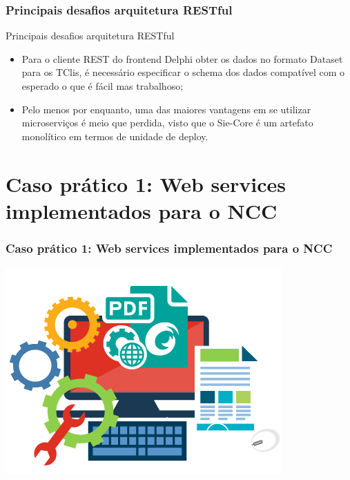 \documentclass{beamer}
\begin{document}
\begin{frame}
\frametitle{Principais desafios arquitetura RESTful}

\begin{exampleblock}{Principais desafios arquitetura RESTful}
\small{
	\begin{itemize}
		\item<1->Para o cliente REST do frontend Delphi obter os dados no formato Dataset para os TClis, é necessário especificar o schema dos dados compatível com o esperado o que é fácil mas trabalhoso;
		\item<1->Pelo menos por enquanto, uma das maiores vantagens em se utilizar microserviços é meio que perdida, visto que o 
		Sie-Core é um artefato monolítico em termos de unidade de deploy.
	\end{itemize}
}
\end{exampleblock}

\end{frame}





\section{Caso prático 1: Web services implementados para o NCC}



\begin{frame}
  \frametitle{Caso prático 1: Web services implementados para o NCC}

	\centering
	\includegraphics[scale=0.4]{img/sdk.png}
  
\end{frame}
\end{document}
